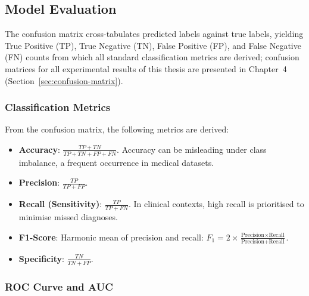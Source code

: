 \subsection{Model Evaluation}

The confusion matrix cross-tabulates predicted labels against true labels, yielding
True Positive (TP), True Negative (TN), False Positive (FP), and False Negative (FN)
counts from which all standard classification metrics are derived; confusion matrices
for all experimental results of this thesis are presented in Chapter~4
(Section~\ref{sec:confusion-matrix}).

\subsubsection{Classification Metrics}

From the confusion matrix, the following metrics are derived:

\begin{itemize}
    \item \textbf{Accuracy}: $\frac{TP + TN}{TP + TN + FP + FN}$.
    Accuracy can be misleading under class imbalance, a frequent occurrence in
    medical datasets.

    \item \textbf{Precision}: $\frac{TP}{TP + FP}$.

    \item \textbf{Recall (Sensitivity)}: $\frac{TP}{TP + FN}$.
    In clinical contexts, high recall is prioritised to minimise missed diagnoses.

    \item \textbf{F1-Score}: Harmonic mean of precision and recall:
    $F_1 = 2 \times \frac{\text{Precision} \times \text{Recall}}{\text{Precision} + \text{Recall}}$.

    \item \textbf{Specificity}: $\frac{TN}{TN + FP}$.
\end{itemize}

\subsubsection{ROC Curve and AUC}

